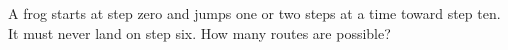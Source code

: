 A frog starts at step zero and jumps one or two steps at a time toward step ten. It must never land on step six. How many routes are possible?
